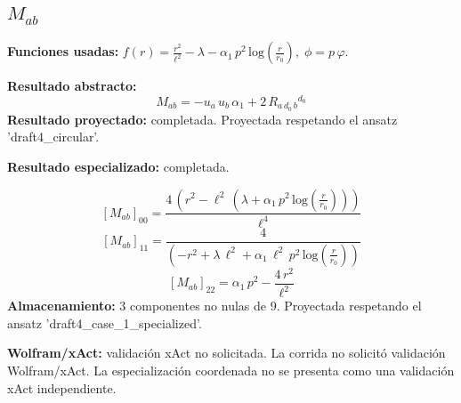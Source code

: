 \documentclass[11pt]{article}
\begin{document}
\subsection*{$ M_{ab} $}
\textbf{Funciones usadas:} $ f\!\left(r\right) = \frac{{r}^{2}}{{\ell}^{2}} - \lambda - \alpha_{1}\,{p}^{2}\,\mathrm{log}\!\left(\frac{r}{r_{0}}\right),\;\phi=p\,\varphi $.\par
\textbf{Resultado abstracto:}
\begin{dmath*}[breakdepth={5}]
M_{ab} = -u{}_{a}\,u{}_{b}\,\alpha_{1} + 2\,R{}_{a\,d_{0}\,b}{}^{d_{0}}
\end{dmath*}
\textbf{Resultado proyectado:} completada. Proyectada respetando el ansatz 'draft4\_circular'.\par
\textbf{Resultado especializado:} completada.\par
\begin{dmath*}[breakdepth={5}]
\left[M_{ab}\right]_{00} = \frac{4\,\left({r}^{2} - {\ell}^{2}\,\left(\lambda + \alpha_{1}\,{p}^{2}\,\mathrm{log}\!\left(\frac{r}{r_{0}}\right)\right)\right)}{{\ell}^{4}}
\end{dmath*}
\begin{dmath*}[breakdepth={5}]
\left[M_{ab}\right]_{11} = \frac{4}{\left(-{r}^{2} + \lambda\,{\ell}^{2} + \alpha_{1}\,{\ell}^{2}\,{p}^{2}\,\mathrm{log}\!\left(\frac{r}{r_{0}}\right)\right)}
\end{dmath*}
\begin{dmath*}[breakdepth={5}]
\left[M_{ab}\right]_{22} = \alpha_{1}\,{p}^{2} - \frac{4\,{r}^{2}}{{\ell}^{2}}
\end{dmath*}
\textbf{Almacenamiento:} 3 componentes no nulas de 9. Proyectada respetando el ansatz 'draft4\_case\_1\_specialized'.\par
\textbf{Wolfram/xAct:} validación xAct no solicitada. La corrida no solicitó validación Wolfram/xAct. La especialización coordenada no se presenta como una validación xAct independiente.\par\medskip
{}
\end{document}
